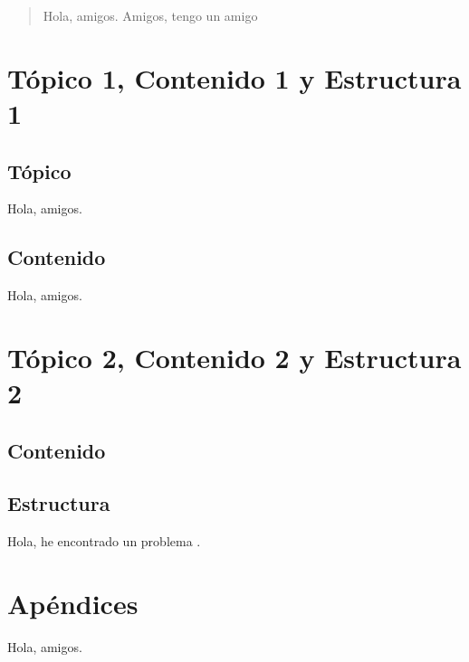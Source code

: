 \documentclass[12pt, a4paper]{article}
\begin{document}
\newpage
\begin{abstract}
    Hola, amigos. Amigos, tengo un amigo
\end{abstract}
\section{Tópico 1, Contenido 1 y Estructura 1}
\subsection{Tópico}
Hola, amigos.
\subsection{Contenido}
Hola, amigos.
\section{Tópico 2, Contenido 2 y Estructura 2}
\subsection{Contenido}
\subsection{Estructura}
Hola, he encontrado un problema \cite{greenwade93}.
\newpage

\renewcommand{\thesubsection}{\Alph{subsection}}
\section*{Apéndices}

\newpage

Hola, amigos.

\newpage
\listoffigures
\listoftables

\printbibliography
\end{document}
